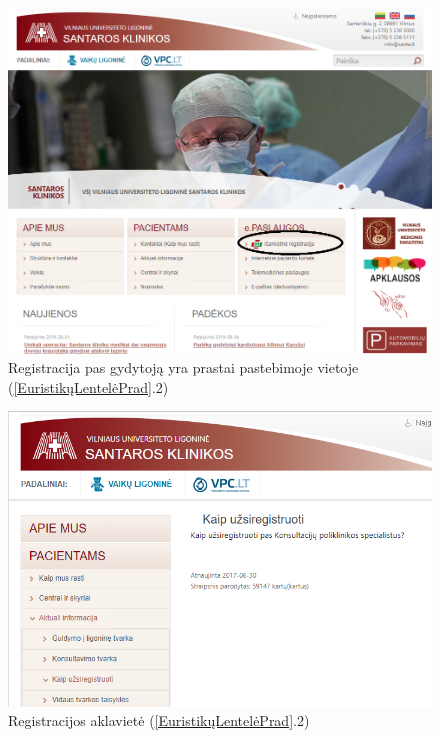 \documentclass{VUMIFPSkursinis}
\begin{document}

\begin{figure}[H]
    \centering
    \includegraphics[scale=0.6]{img/RegistracijaPagrindinis}
    \caption{Registracija pas gydytoją yra prastai pastebimoje vietoje (\ref{EuristikųLentelėPrad}.2)}
    \label{img:RegistracijaPagrindinis}
\end{figure}

\begin{figure}[H]
    \centering
    \includegraphics[scale=0.8]{img/RegistracijosAklavietė}
    \caption{Registracijos aklavietė (\ref{EuristikųLentelėPrad}.2)}
    \label{img:registracija}
\end{figure}
\end{document}
